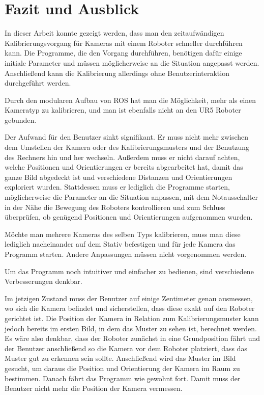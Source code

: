 \chapter{Fazit und Ausblick}
\label{chap:fazit_und_ausblick}
In dieser Arbeit konnte gezeigt werden, dass man den zeitaufwändigen Kalibrierungsvorgang für Kameras mit einem Roboter schneller durchführen kann. Die Programme, die den Vorgang durchführen, benötigen dafür einige initiale Parameter und müssen möglicherweise an die Situation angepasst werden. Anschließend kann die Kalibrierung allerdings ohne Benutzerinteraktion durchgeführt werden.

Durch den modularen Aufbau von ROS hat man die Möglichkeit, mehr als einen Kameratyp zu kalibrieren, und man ist ebenfalls nicht an den UR5 Roboter gebunden. 

Der Aufwand für den Benutzer sinkt signifikant. Er muss nicht mehr zwischen dem Umstellen der Kamera oder des Kalibrierungsmusters und der Benutzung des Rechners hin und her wechseln. Außerdem muss er nicht darauf achten, welche Positionen und Orientierungen er bereits abgearbeitet hat, damit das ganze Bild abgedeckt ist und verschiedene Distanzen und Orientierungen exploriert wurden. Stattdessen muss er lediglich die Programme starten, möglicherweise die Parameter an die Situation anpassen, mit dem Notausschalter in der Nähe die Bewegung des Roboters kontrollieren und zum Schluss überprüfen, ob genügend Positionen und Orientierungen aufgenommen wurden.

Möchte man mehrere Kameras des selben Typs kalibrieren, muss man diese lediglich nacheinander auf dem Stativ befestigen und für jede Kamera das Programm starten. Andere Anpassungen müssen nicht vorgenommen werden.

Um das Programm noch intuitiver und einfacher zu bedienen, sind verschiedene Verbesserungen denkbar.

Im jetzigen Zustand muss der Benutzer auf einige Zentimeter genau ausmessen, wo sich die Kamera befindet und sicherstellen, dass diese exakt auf den Roboter gerichtet ist. Die Position der Kamera in Relation zum Kalibrierungsmuster kann jedoch bereits im ersten Bild, in dem das Muster zu sehen ist, berechnet werden. Es wäre also denkbar, dass der Roboter zunächst in eine Grundposition fährt und der Benutzer anschließend so die Kamera vor dem Roboter platziert, dass das Muster gut zu erkennen sein sollte. Anschließend wird das Muster im Bild gesucht, um daraus die Position und Orientierung der Kamera im Raum zu bestimmen. Danach fährt das Programm wie gewohnt fort. Damit muss der Benutzer nicht mehr die Position der Kamera vermessen.

